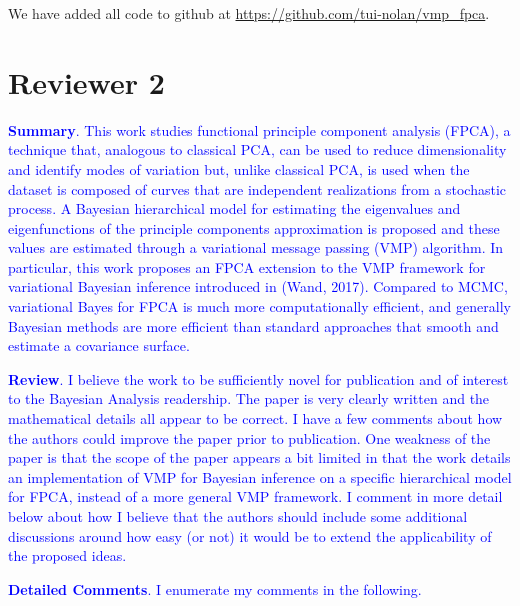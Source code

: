 \documentclass[12pt]{article}
\theoremstyle{plain}
\theoremstyle{definition}
\theoremstyle{remark}
\begin{document}
\vspace{1\baselineskip}

We have added all code to github at \url{https://github.com/tui-nolan/vmp_fpca}.


\section*{Reviewer 2}

\textcolor{blue}{
	\textbf{Summary}. This work studies functional principle component analysis (FPCA), a technique that, analogous to
	classical PCA, can be used to reduce dimensionality and identify modes of variation but, unlike classical PCA, is used
	when the dataset is composed of curves that are independent realizations from a stochastic process. A Bayesian hierarchical
	model for estimating the eigenvalues and eigenfunctions of the principle components approximation is proposed and these
	values are estimated through a variational message passing (VMP) algorithm. In particular, this work proposes an FPCA
	extension to the VMP framework for variational Bayesian inference introduced in (Wand, 2017). Compared to MCMC, variational
	Bayes for FPCA is much more computationally efficient, and generally Bayesian methods are more efficient than standard
	approaches that smooth and estimate a covariance surface.
}

\vspace{1\baselineskip}

\textcolor{blue}{
	\textbf{Review}. I believe the work to be sufficiently novel for publication and of interest to the Bayesian Analysis readership.
	The paper is very clearly written and the mathematical details all appear to be correct. I have a few comments about how the
	authors could improve the paper prior to publication. One weakness of the paper is that the scope of the paper appears a bit
	limited in that the work details an implementation of VMP for Bayesian inference on a specific hierarchical model for FPCA, instead
	of a more general VMP framework. I comment in more detail below about how I believe that the authors should include some
	additional discussions around how easy (or not) it would be to extend the applicability of the proposed ideas.
}

\vspace{1\baselineskip}

\textcolor{blue}{
	\textbf{Detailed Comments}. I enumerate my comments in the following.
}
\end{document}
